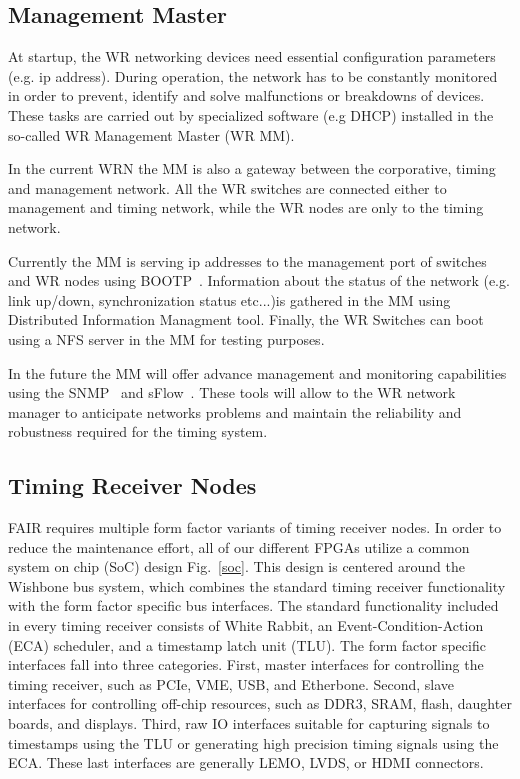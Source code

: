 \subsection{Management Master}

At startup, the WR networking devices need essential configuration parameters (e.g. ip
address). During operation, the network has to be constantly monitored in
order to prevent, identify and solve malfunctions or breakdowns of devices. 
These tasks are carried out by specialized software (e.g DHCP) installed in the
so-called WR Management Master (WR MM). 

In the current WRN the MM is also a gateway between the corporative, timing and management 
network. All the WR switches are connected either to management and timing
network, while the WR nodes are only to the timing network. 

Currently the MM is serving ip addresses to the management port of switches and WR
nodes using BOOTP~\cite{bootp}. Information about the status of the network (e.g.
link up/down, synchronization status etc...)is gathered in the MM using Distributed Information Managment
tool. Finally, the WR Switches can boot using a NFS server in the MM for testing
purposes. 

In the future the MM will offer advance management and monitoring capabilities
using the SNMP~\cite{snmp} and sFlow~\cite{sflow}. These tools will allow to the 
WR network manager to anticipate networks problems and maintain the reliability
and robustness required for the timing system.


\subsection{Timing Receiver Nodes}

FAIR requires multiple form factor variants of timing receiver nodes.
In order to reduce the maintenance effort,
all of our different FPGAs utilize a common system on chip (SoC)
design Fig.~\ref{soc}.
This design is centered around the Wishbone bus system,
which combines the standard timing receiver functionality with 
the form factor specific bus interfaces.
The standard functionality included in every timing receiver
consists of White Rabbit, an Event-Condition-Action (ECA) scheduler,
and a timestamp latch unit (TLU).
The form factor specific interfaces fall into three categories.
First, master interfaces for controlling the timing receiver,
such as PCIe, VME, USB, and Etherbone.
Second, slave interfaces for controlling off-chip resources,
such as DDR3, SRAM, flash, daughter boards, and displays.
Third, raw IO interfaces suitable for capturing signals to 
timestamps using the TLU or generating high precision timing
signals using the ECA.
These last interfaces are generally LEMO, LVDS, or HDMI connectors.

